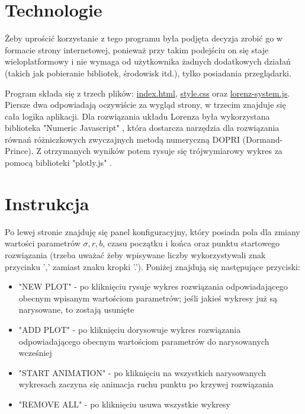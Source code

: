 \documentclass[12pt]{report}
\begin{document}
	\section{Technologie}
	\par Żeby uprościć korzystanie z tego programu była podjęta decyzja zrobić go w formacie strony internetowej, ponieważ przy takim podejściu on się staje wieloplatformowy i nie wymaga od użytkownika żadnych dodatkowych działań (takich jak pobieranie bibliotek, środowisk itd.), tylko posiadania przeglądarki.
	
	\par Program składa się z trzech plików: \hyperref[sec:html]{index.html}, \hyperref[sec:css]{style.css} oraz \hyperref[sec:js]{lorenz-system.js}. Piersze dwa odpowiadają oczywiście za wygląd strony, w trzecim znajduje się cała logika aplikacji. Dla rozwiązania układu Lorenza była wykorzystana biblioteka "Numeric Javascript" \cite{NumJS}, która dostarcza narzędzia dla rozwiązania równań różniczkowych zwyczajnych metodą numeryczną DOPRI (Dormand-Prince). Z otrzymanych wyników potem rysuje się trójwymiarowy wykres za pomocą biblioteki "plotly.js" \cite{Ply}.
	
	\section{Instrukcja}
	\par Po lewej stronie znajduję się panel konfiguracyjny, który posiada pola dla zmiany wartości parametrów $\sigma, r, b$, czasu początku i końca oraz punktu startowego rozwiązania (trzeba uważać żeby wpisywane liczby wykorzystywali znak przycinku ',' zamiast znaku kropki '.'). Poniżej znajdują się następujące przyciski:
	\begin{itemize}
		\item "NEW PLOT" - po kliknięciu rysuje wykres rozwiązania odpowiadającego obecnym wpisanym wartościom parametrów; jeśli jakieś wykresy już są narysowane, to zostają usunięte
		\item "ADD PLOT" - po kliknięciu dorysowuje wykres rozwiązania odpowiadającego obecnym wartościom parametrów do narysowanych wcześniej
		\item "START ANIMATION" - po kliknięciu na wszystkich narysowanych wykresach zaczyna się animacja ruchu punktu po krzywej rozwiązania
		\item "REMOVE ALL" - po kliknięciu usuwa wszystkie wykresy
	\end{itemize}
\end{document}
